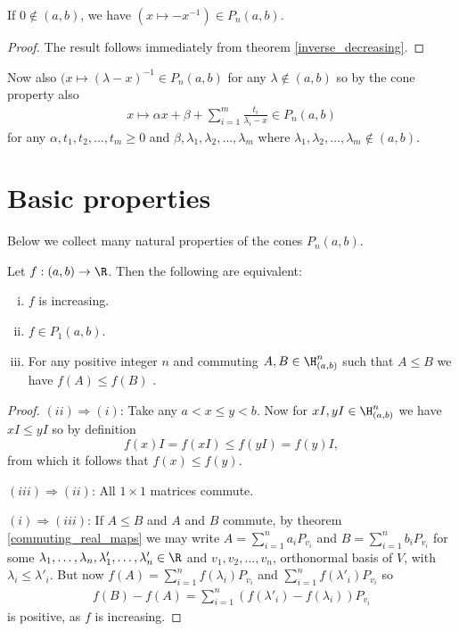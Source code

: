 \begin{prop}
	If $0 \notin (a, b)$, we have $(x \mapsto -x^{-1}) \in P_{n}(a, b)$.
\end{prop}
\begin{proof}
	The result follows immediately from theorem \ref{inverse_decreasing}.
\end{proof}

Now also $(x \mapsto (\lambda - x)^{-1} \in P_{n}(a, b)$ for any $\lambda \notin (a, b)$ so by the cone property also
\begin{align}\label{finite_pick}
	x \mapsto \alpha x + \beta + \sum_{i = 1}^{m} \frac{t_{i}}{\lambda_{i} - x} \in P_{n}(a, b)
\end{align}
for any $\alpha, t_{1}, t_{2}, \ldots, t_{m} \geq 0$ and $\beta, \lambda_{1}, \lambda_{2}, \ldots, \lambda_{m}$ where $\lambda_{1}, \lambda_{2}, \ldots, \lambda_{m} \not\in (a, b)$.

\section{Basic properties}

Below we collect many natural properties of the cones $P_{n}(a, b)$.

\begin{prop}
	Let $f : (a, b) \to \R$. Then the following are equivalent:
	\begin{enumerate}[(i)]
		\item $f$ is increasing.
		\item $f \in P_{1}(a, b)$.
		\item For any positive integer $n$ and commuting $A, B \in \H^{n}_{(a, b)}$ such that $A \leq B$ we have $f(A) \leq f(B)$ .
	\end{enumerate}
\end{prop}
\begin{proof}
	$(ii) \Rightarrow (i)$: Take any $a < x \leq y < b$. Now for $xI, yI \in \H^{n}_{(a, b)}$ we have $x I \leq y I$ so by definition
	\[
		f(x) I = f(xI) \leq f(y I) = f(y) I,
	\]
	from which it follows that $f(x) \leq f(y)$.

	$(iii) \Rightarrow (ii)$: All $1 \times 1$ matrices commute.
	

	$(i) \Rightarrow (iii)$: If $A \leq B$ and $A$ and $B$ commute, by theorem \ref{commuting_real_maps} we may write $A = \sum_{i = 1}^{n} a_{i} P_{v_{i}}$ and $B = \sum_{i = 1}^{n} b_{i} P_{v_{i}}$ for some $\lambda_{1}, \ldots, \lambda_{n}, \lambda'_{1}, \ldots, \lambda'_{n} \in \R$ and $v_{1}, v_{2}, \ldots, v_{n}$, orthonormal basis of $V$, with $\lambda_{i} \leq \lambda'_{i}$. But now $f(A) = \sum_{i = 1}^{n} f(\lambda_{i}) P_{v_{i}}$ and $\sum_{i = 1}^{n} f(\lambda'_{i}) P_{v_{i}}$ so
	\begin{align*}
		f(B) - f(A) = \sum_{i = 1}^{n} (f(\lambda'_{i}) - f(\lambda_{i})) P_{v_{i}}
	\end{align*}
	is positive, as $f$ is increasing.
\end{proof}

